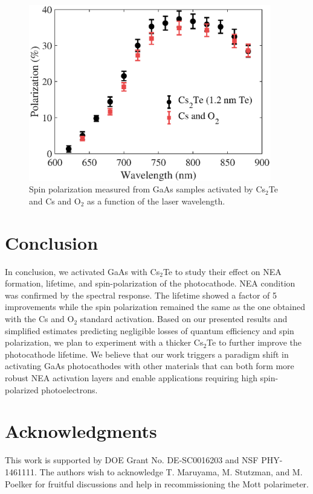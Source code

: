 \begin{figure}
    \centering
    \includegraphics[width=300pt]{figs/CsTe/pol.eps}
    \caption{Spin polarization measured from GaAs samples activated by Cs$_2$Te and Cs and O$_2$ as a function of the laser wavelength. %
    }
    \label{pol}
\end{figure}

\section{Conclusion}

In conclusion, we activated GaAs with Cs$_2$Te to study their effect on NEA formation, lifetime, and spin-polarization of the photocathode. NEA condition was confirmed by the spectral response. The lifetime showed a factor of 5 improvements while the spin polarization remained the same as the one obtained with the Cs and O$_2$ standard activation.
Based on our presented results and simplified estimates predicting negligible losses of quantum efficiency and spin polarization, we plan to experiment with a thicker Cs$_2$Te to further improve the photocathode lifetime.
We believe that our work triggers a paradigm shift in activating GaAs photocathodes with other materials that can both form more robust NEA activation layers and enable applications requiring high spin-polarized photoelectrons.

\section{Acknowledgments}
This work is supported by DOE Grant No. DE-SC0016203 and NSF PHY-1461111. The authors wish to acknowledge T. Maruyama, M. Stutzman, and M. Poelker for fruitful discussions and help in recommissioning the Mott polarimeter.
